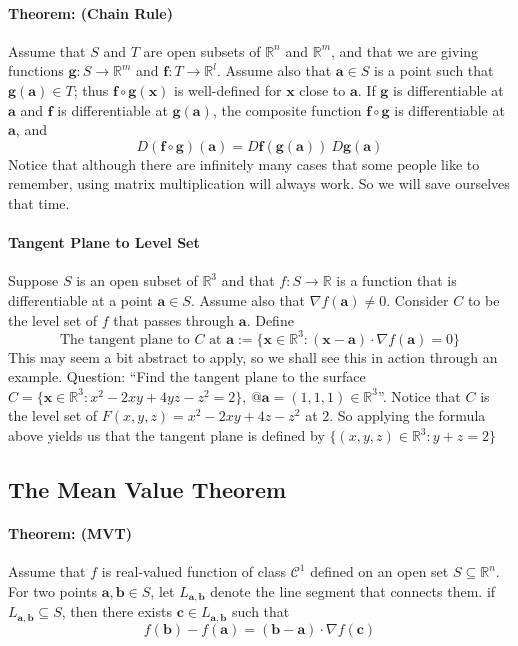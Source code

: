\documentclass[11pt]{article}
\newcommand{\real}{\mathbb{R}}
\newcommand{\va}{\mathbf{a}}
\newcommand{\vb}{\mathbf{b}}
\newcommand{\vx}{\mathbf{x}}
\newcommand{\vc}{\mathbf{c}}
\newcommand{\ba}{\mathbf{a}}
\newcommand{\boldf}{\mathbf{f}}
\newcommand{\bg}{\mathbf{g}}
\begin{document}
\paragraph{Theorem: (Chain Rule)} Assume that $S$ and $T$ are open subsets of $\real^n$ and $\real^m$, and that we are giving functions $\mathbf{g}:S\to \real^m$ and $\boldf: T\to \real^l$. Assume also that $\va\in S$ is a point such that $\mathbf{g}(\va)\in T$; thus $\boldf\circ \mathbf{g}(\vx)$ is well-defined for $\vx$ close to $\va$. If $\mathbf{g}$ is differentiable at $\va$ and $\boldf$ is differentiable at $\mathbf{g}(\va)$, the composite function $\boldf\circ\mathbf{g}$ is differentiable at $\va$, and
\begin{equation*}
    \boxed{ D(\boldf\circ\mathbf{g})(\ba) = D\boldf(\mathbf{g}(\ba)) \ D\bg(\ba)}
\end{equation*}
Notice that although there are infinitely many cases that some people like to remember, using matrix multiplication will always work. So we will save ourselves that time.

\paragraph{Tangent Plane to Level Set} Suppose $S$ is an open subset of $\real^3$ and that $f:S\to \real$ is a function that is differentiable at a point $\va\in S$. Assume also that $\nabla f(\va) \neq 0$. Consider $C$ to be the level set of $f$ that passes through $\va$. Define
\begin{equation*}
    \text{The tangent plane to $C$ at $\va$}:=\{ \vx\in \real^3:(\vx - \va)\cdot \nabla f(\va) = 0 \}
\end{equation*}
This may seem a bit abstract to apply, so we shall see this in action through an example. Question: ``Find the tangent plane to the surface $C = \{\vx\in \real^3: x^2 - 2xy + 4yz - z^2 = 2\}, \,@\va = (1,1,1)\in \real^3$''. Notice that $C$ is the level set of $F(x,y,z)=x^2-2xy+4z-z^2$ at $2$. So applying the formula above yields us that the tangent plane is defined by $\{ (x,y,z)\in\real^3:y+z=2\}$

\subsection{The Mean Value Theorem}
\paragraph{Theorem: (MVT)} Assume that $f$ is real-valued function of class $\mathcal{C}^1$ defined on an open set $S\subseteq \real^n$. For two points $\va,\vb\in S$, let $L_{\va,\vb}$ denote the line segment that connects them. if $L_{\va,\vb}\subseteq S$, then there exists $\vc\in L_{\va,\vb}$ such that
\begin{equation*}
    f(\vb)-f(\va)=(\vb-\va)\cdot\nabla f(\vc)
\end{equation*}
\end{document}
